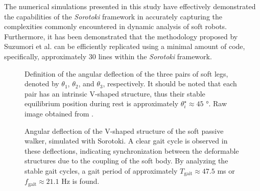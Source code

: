 The numerical simulations presented in this study have effectively demonstrated the capabilities of the  \textit{Sorotoki} framework in accurately capturing the complexities commonly encountered in dynamic analysis of soft robots. Furthermore, it has been demonstrated that the methodology proposed by Suzumori et al. \cite{Suzumori2008Sep} can be efficiently replicated using a minimal amount of code, specifically, approximately 30 lines within the \textit{Sorotoki} framework.

\begin{figure}[!t]
\centering
\def\svgwidth{0.85\textwidth}

%
\caption{Definition of the angular deflection of the three pairs of soft legs, denoted by $\theta_1$, $\theta_2$, and $\theta_3$, respectively. It should be noted that each pair has an intrinsic V-shaped structure, thus their stable equilibrium position during rest is approximately $\theta_i^\star \approx 45$ \si{\degree}. Raw image obtained from \cite{Suzumori2008Sep}.}
\label{fig:C5:passivewalker_states}
\vspace{-2mm}
\end{figure}
%
\begin{figure}[!t]
    \caption{Angular deflection of the V-shaped structure of the soft passive walker, simulated with Sorotoki. A clear gait cycle is observed in these deflections, indicating synchronization between the deformable structures due to the coupling of the soft body. By analyzing the stable gait cycles, a gait period of approximately $T_{\textrm{gait}} \approx 47.5$ \si{\milli \second} or $f_{\textrm{gait}} \approx 21.1$ \si{\hertz} is found.}
    \label{fig:C5:passivewalker_gait}
    \vspace{-6mm}
\end{figure}


